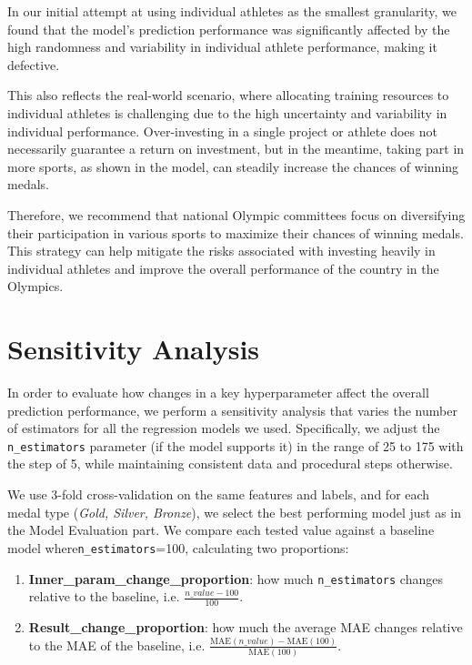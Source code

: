 \documentclass{mcmthesis}
\begin{document}
In our initial attempt at using individual athletes as the smallest granularity, we found that the model's prediction performance was significantly affected by the high randomness and variability in individual athlete performance, making it defective.

This also reflects the real-world scenario, where allocating training resources to individual athletes is challenging due to the high uncertainty and variability in individual performance. Over-investing in a single project or athlete does not necessarily guarantee a return on investment, but in the meantime, taking part in more sports, as shown in the model, can steadily increase the chances of winning medals.

Therefore, we recommend that national Olympic committees focus on diversifying their participation in various sports to maximize their chances of winning medals. This strategy can help mitigate the risks associated with investing heavily in individual athletes and improve the overall performance of the country in the Olympics.









\section{Sensitivity Analysis}
In order to evaluate how changes in a key hyperparameter affect the overall prediction performance,
we perform a sensitivity analysis that varies the number of estimators for all the regression models we used.
Specifically, we adjust the \texttt{n\_estimators} parameter (if the model supports it) in the range of 25 to 175 with the step of 5, while maintaining consistent data and procedural steps otherwise.

We use 3-fold cross-validation on the same features and labels, and for each medal type
(\textit{Gold, Silver, Bronze}), we select the best performing model just as in the Model Evaluation part.
We compare each tested value against a baseline model where\texttt{n\_estimators}=100, calculating two proportions:
\begin{enumerate}
    \item \textbf{Inner\_param\_change\_proportion}: how much \texttt{n\_estimators} changes
    relative to the baseline, i.e. \(\frac{n\_value - 100}{100}\).
    \item \textbf{Result\_change\_proportion}: how much the average MAE changes
    relative to the MAE of the baseline, i.e. \(\frac{\text{MAE}(n\_value) - \text{MAE}(100)}{\text{MAE}(100)}\).
\end{enumerate}
\end{document}
